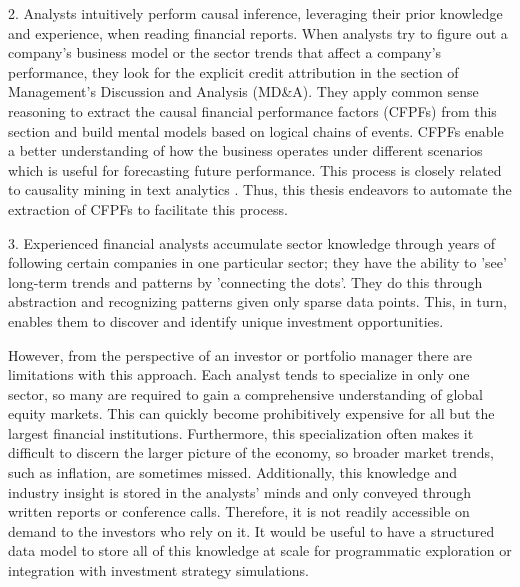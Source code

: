 2. Analysts intuitively perform causal inference, leveraging their prior knowledge and experience, when reading financial reports. When analysts try to figure out a company's business model or the sector trends that affect a company's performance, they look for the explicit credit attribution in the section of Management's Discussion and Analysis (MD\&A). They apply common sense reasoning to extract the causal financial performance factors (CFPFs) from this section and build mental models based on logical chains of events. CFPFs enable a better understanding of how the business operates under different scenarios which is useful for forecasting future performance. This process is closely related to causality mining in text analytics \cite{Ali21Survey,Yang21Survey}. Thus, this thesis endeavors to automate the extraction of CFPFs to facilitate this process.


3. Experienced financial analysts accumulate sector knowledge through years of following certain companies in one particular sector; they have the ability to 'see' long-term trends and patterns by 'connecting the dots'. They do this through abstraction and recognizing patterns given only sparse data points. This, in turn, enables them to discover and identify unique investment opportunities. 

However, from the perspective of an investor or portfolio manager there are limitations with this approach. Each analyst tends to specialize in only one sector, so many are required to gain a comprehensive understanding of global equity markets. This can quickly become prohibitively expensive for all but the largest financial institutions. Furthermore, this specialization often makes it difficult to discern the larger picture of the economy, so broader market trends, such as inflation, are sometimes missed.  
Additionally, this knowledge and industry insight is stored in the analysts' minds and only conveyed through written reports or conference calls. Therefore, it is not readily accessible on demand to the investors who rely on it.  It would be useful to have a structured data model to store all of this knowledge at scale for programmatic exploration or integration with investment strategy simulations. 


